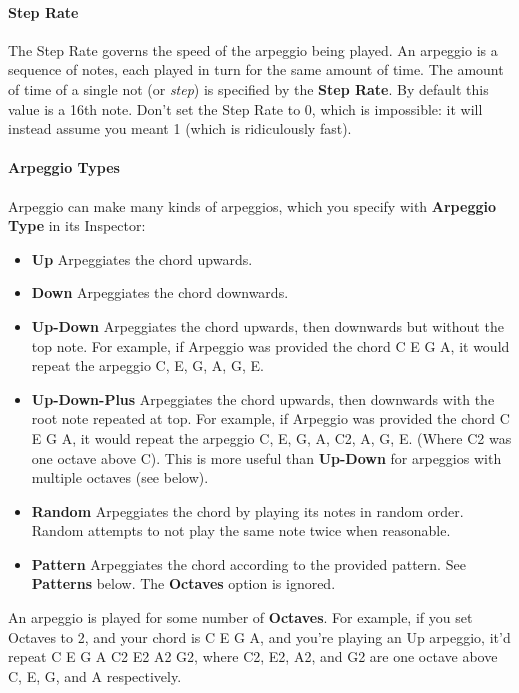 \documentclass[twoside,10pt]{article}
\begin{document}
\paragraph{Step Rate}

The Step Rate governs the speed of the arpeggio being played.  An arpeggio is a sequence of notes, each played in turn for the same amount of time.  The amount of time of a single not (or {\it step}) is specified by the {\bf Step Rate}.  By default this value is a 16th note.  Don't set the Step Rate to 0, which is impossible: it will instead assume you meant 1 (which is ridiculously fast).


\paragraph{Arpeggio Types}

Arpeggio can make many kinds of arpeggios, which you specify with {\bf Arpeggio Type} in its Inspector:

\begin{itemize}
\item {\bf Up} Arpeggiates the chord upwards. 
\item {\bf Down} Arpeggiates the chord downwards. 
\item {\bf Up-Down} Arpeggiates the chord upwards, then downwards but without the top note.  For example, if Arpeggio was provided the chord C E G A, it would repeat the arpeggio C, E, G, A, G, E.
\item {\bf Up-Down-Plus} Arpeggiates the chord upwards, then downwards with the root note repeated at top.  For example, if Arpeggio was provided the chord C E G A, it would repeat the arpeggio C, E, G, A, C2, A, G, E.  (Where C2 was one octave above C).  This is more useful than {\bf Up-Down} for arpeggios with multiple octaves (see below).  
\item {\bf Random} Arpeggiates the chord by playing its notes in random order.  Random attempts to not play the same note twice when reasonable. 
\item {\bf Pattern} Arpeggiates the chord according to the provided pattern.  See {\bf Patterns} below.   The {\bf Octaves} option is ignored.
\end{itemize}

An arpeggio is played for some number of {\bf Octaves}.  For example, if you set Octaves to 2, and your chord is C E G A, and you're playing an Up arpeggio, it'd repeat C E G A C2 E2 A2 G2, where C2, E2, A2, and G2 are one octave above C, E, G, and A respectively.
\end{document}
